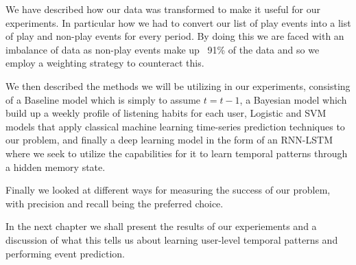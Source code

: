We have described how our data was transformed to make it useful for our experiments. In particular how we had to convert our list of play events into a list of play and non-play events for every period. By doing this we are faced with an imbalance of data as non-play events make up ~91\% of the data and so we employ a weighting strategy to counteract this.

We then described the methods we will be utilizing in our experiments, consisting of a Baseline model which is simply to assume $t =t-1$, a Bayesian model which build up a weekly profile of listening habits for each user, Logistic and SVM models that apply classical machine learning time-series prediction techniques to our problem, and finally a deep learning model in the form of an RNN-LSTM where we seek to utilize the capabilities for it to learn temporal patterns through a hidden memory state.

Finally we looked at different ways for measuring the success of our problem, with precision and recall being the preferred choice.

In the next chapter we shall present the results of our experiements and a discussion of what this tells us about learning user-level temporal patterns and performing event prediction.